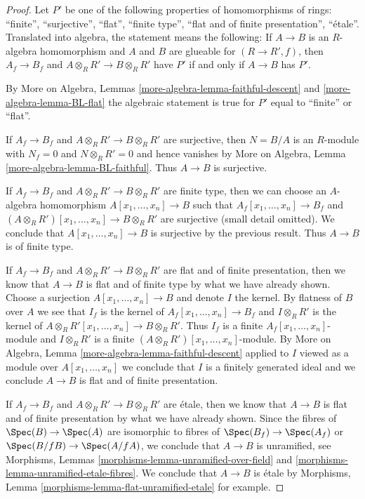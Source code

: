 \begin{proof}
Let $P'$ be one of the following properties of homomorphisms of rings:
``finite'', ``surjective'', ``flat'', ``finite type'',
``flat and of finite presentation'', ``\'etale''.
Translated into algebra, the statement means the following:
If $A \to B$ is an $R$-algebra homomorphism and $A$ and $B$
are glueable for $(R \to R', f)$, then
$A_f \to B_f$ and $A \otimes_R R' \to B \otimes_R R'$ have $P'$
if and only if $A \to B$ has $P'$.

\medskip\noindent
By More on Algebra, Lemmas \ref{more-algebra-lemma-faithful-descent}
and \ref{more-algebra-lemma-BL-flat} the algebraic statement
is true for $P'$ equal to ``finite'' or ``flat''.

\medskip\noindent
If $A_f \to B_f$ and $A \otimes_R R' \to B \otimes_R R'$ are surjective,
then $N = B/A$ is an $R$-module with $N_f = 0$ and $N \otimes_R R' = 0$ and
hence vanishes by More on Algebra, Lemma
\ref{more-algebra-lemma-BL-faithful}. Thus $A \to B$ is surjective.

\medskip\noindent
If $A_f \to B_f$ and $A \otimes_R R' \to B \otimes_R R'$ are finite type,
then we can choose an $A$-algebra homomorphism $A[x_1, \ldots, x_n] \to B$
such that $A_f[x_1, \ldots, x_n] \to B_f$ and
$(A \otimes_R R')[x_1, \ldots, x_n] \to B \otimes_R R'$ are surjective
(small detail omitted). We conclude that $A[x_1, \ldots, x_n] \to B$
is surjective by the previous result. Thus $A \to B$ is of finite type.

\medskip\noindent
If $A_f \to B_f$ and $A \otimes_R R' \to B \otimes_R R'$ are
flat and of finite presentation, then we know that $A \to B$ is flat and
of finite type by what we have already shown. Choose a surjection
$A[x_1, \ldots, x_n] \to B$ and denote $I$ the kernel.
By flatness of $B$ over $A$ we see that $I_f$ is the kernel of
$A_f[x_1, \ldots, x_n] \to B_f$ and $I \otimes_R R'$ is the kernel of
$A \otimes_R R'[x_1, \ldots, x_n] \to B \otimes_R R'$.
Thus $I_f$ is a finite $A_f[x_1, \ldots, x_n]$-module and
$I \otimes_R R'$ is a finite $(A \otimes_R R')[x_1, \ldots, x_n]$-module.
By More on Algebra, Lemma \ref{more-algebra-lemma-faithful-descent}
applied to $I$ viewed as a module over $A[x_1, \ldots, x_n]$
we conclude that $I$ is a finitely generated ideal and we conclude
$A \to B$ is flat and of finite presentation.

\medskip\noindent
If $A_f \to B_f$ and $A \otimes_R R' \to B \otimes_R R'$ are \'etale,
then we know that $A \to B$ is flat and of finite presentation by what
we have already shown. Since the fibres of $\Spec(B) \to \Spec(A)$
are isomorphic to fibres of $\Spec(B_f) \to \Spec(A_f)$ or
$\Spec(B/fB) \to \Spec(A/fA)$, we conclude that $A \to B$ is unramified,
see Morphisms, Lemmas \ref{morphisms-lemma-unramified-over-field}
and \ref{morphisms-lemma-unramified-etale-fibres}.
We conclude that $A \to B$ is \'etale by
Morphisms, Lemma \ref{morphisms-lemma-flat-unramified-etale} for example.
\end{proof}


